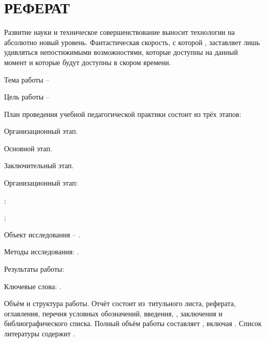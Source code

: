 \chapter*{\centering РЕФЕРАТ}

Развитие науки и техническое совершенствование выносит технологии  на абсолютно новый уровень.
Фантастическая скорость, с которой , заставляет лишь удивляться непостижимыми возможностями,
которые доступны на данный момент и которые будут доступны в скором времени.

Тема работы -- 

Цель работы -- 

План проведения учебной педагогической практики состоит из трёх этапов:
\begin{enumeratePaper}
    \item Организационный этап.
    \item Основной этап.
    \item Заключительный этап.
\end{enumeratePaper}
Организационный этап:
\begin{itemizePaper}
    \item {};
    \item {};
\end{itemizePaper}

Объект исследования -- .

Методы исследования: .

Результаты работы:

Ключевые слова: .

Объём и структура работы.
Отчёт состоит из~титульного листа,
реферата,
оглавления,
перечня условных обозначений,
введения,
,
заключения
и
библиографического списка.
Полный объём работы составляет
, включая
.
Список литературы содержит
.
